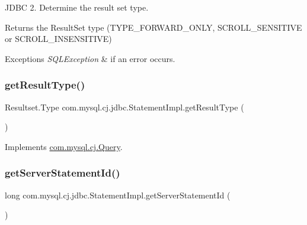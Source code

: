 J\+D\+BC 2. Determine the result set type.

\begin{DoxyReturn}{Returns}
the Result\+Set type (T\+Y\+P\+E\+\_\+\+F\+O\+R\+W\+A\+R\+D\+\_\+\+O\+N\+LY, S\+C\+R\+O\+L\+L\+\_\+\+S\+E\+N\+S\+I\+T\+I\+VE or S\+C\+R\+O\+L\+L\+\_\+\+I\+N\+S\+E\+N\+S\+I\+T\+I\+VE)
\end{DoxyReturn}

\begin{DoxyExceptions}{Exceptions}
{\em S\+Q\+L\+Exception} & if an error occurs. \\
\hline
\end{DoxyExceptions}
\mbox{\label{classcom_1_1mysql_1_1cj_1_1jdbc_1_1_statement_impl_a4f0bfa0851a118ae62acd9420304bdd0}} 
\subsubsection{\texorpdfstring{get\+Result\+Type()}{getResultType()}}
{\footnotesize\ttfamily Resultset.\+Type com.\+mysql.\+cj.\+jdbc.\+Statement\+Impl.\+get\+Result\+Type (\begin{DoxyParamCaption}{ }\end{DoxyParamCaption})}



Implements \mbox{\hyperlink{interfacecom_1_1mysql_1_1cj_1_1_query_a1e97cf75ff946bef7b89512a69199b90}{com.\+mysql.\+cj.\+Query}}.

\mbox{\label{classcom_1_1mysql_1_1cj_1_1jdbc_1_1_statement_impl_ae87860ea933fb4d96b255f57d5fa5580}} 
\subsubsection{\texorpdfstring{get\+Server\+Statement\+Id()}{getServerStatementId()}}
{\footnotesize\ttfamily long com.\+mysql.\+cj.\+jdbc.\+Statement\+Impl.\+get\+Server\+Statement\+Id (\begin{DoxyParamCaption}{ }\end{DoxyParamCaption})}

